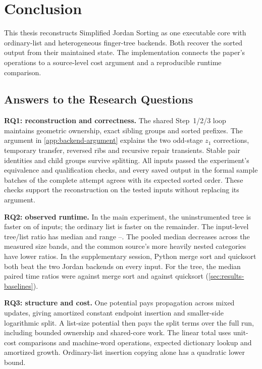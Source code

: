 \chapter{Conclusion}
\label{chap:conclusion}
\label{sec:conclusion-summary}

This thesis reconstructs Simplified Jordan Sorting as one executable core with
ordinary-list and heterogeneous finger-tree backends. Both recover the sorted
output from their maintained state. The implementation connects the paper's
operations to a source-level cost argument and a reproducible runtime comparison.

\section{Answers to the Research Questions}
\label{sec:conclusion-questions}
\label{sec:conclusion-rq1}

\textbf{RQ1: reconstruction and correctness.}
The shared Step~1/2/3 loop maintains geometric ownership, exact sibling groups
and sorted prefixes. The argument in \cref{app:backend-argument} explains the
two odd-stage $z_1$ corrections, temporary transfer, reversed ribs and recursive
repair transients. Stable pair identities and child groups survive splitting.
All \UnifiedN{} inputs passed the experiment's equivalence and qualification
checks, and every saved output in the \UnifiedBatches{} formal sample batches
of the complete attempt agrees with its expected sorted order. These checks
support the reconstruction on the tested inputs without replacing its argument.

\label{sec:conclusion-rq2}
\textbf{RQ2: observed runtime.}
In the main experiment, the uninstrumented tree is faster on \UnifiedWins{} of \UnifiedN{} inputs;
the ordinary list is faster on the remainder. The input-level tree/list ratio
has median \UnifiedMedian{} and range \UnifiedMinimum{}--\UnifiedMaximum{}.
The pooled median decreases across the measured size bands, and the common
source's more heavily nested categories have lower ratios.
In the supplementary session, Python merge sort and quicksort both beat
the two Jordan backends on every input. For the tree, the median paired
time ratios were \BaselineTreeMerge{} against merge sort and
\BaselineTreeQuick{} against quicksort (\cref{sec:results-baselines}).

\label{sec:conclusion-rq3}
\textbf{RQ3: structure and cost.}
One potential pays propagation across mixed updates, giving amortized constant
endpoint insertion and smaller-side logarithmic split. A list-size potential
then pays the split terms over the full run, including bounded ownership and
shared-core work. The linear total uses unit-cost comparisons and machine-word
operations, expected dictionary lookup and amortized growth. Ordinary-list
insertion copying alone has a quadratic lower bound.

